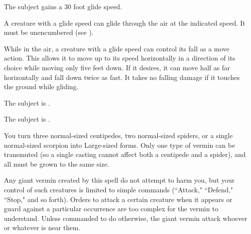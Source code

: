 \spellrng{\rngmed}
\spelldur{\durlong}
\begin{spelleffect}
  The subject gains a 30 foot glide speed.
\end{spelleffect}
\begin{spellnotes}
    A creature with a glide speed can glide through the air at the indicated speed. It must be unencumbered (see ).

    While in the air, a creature with a glide speed can control its fall as a move action. This allows it to move up to its speed horizontally in a direction of its choice while moving only five feet down. If it desires, it can move half as far horizontally and fall down twice as fast. It takes no falling damage if it touches the ground while gliding.
\end{spellnotes}

\spellrng{\rngclose}
\begin{spellhealthy}
    The subject is \sickened.
\end{spellhealthy}
\begin{spellblood}
    The subject is \nauseated.
\end{spellblood}

\spellrng{\rngclose}
\spelldur{\durmed}
\begin{spelleffect}
  You turn three normal-sized centipedes, two normal-sized spiders, or a single normal-sized scorpion into Large-sized forms. Only one type of vermin can be transmuted (so a single casting cannot affect both a centipede and a spider), and all must be grown to the same size.
  \par Any giant vermin created by this spell do not attempt to harm you, but your control of such creatures is limited to simple commands (``Attack," ``Defend," ``Stop," and so forth). Orders to attack a certain creature when it appears or guard against a particular occurrence are too complex for the vermin to understand. Unless commanded to do otherwise, the giant vermin attack whoever or whatever is near them.
\end{spelleffect}

